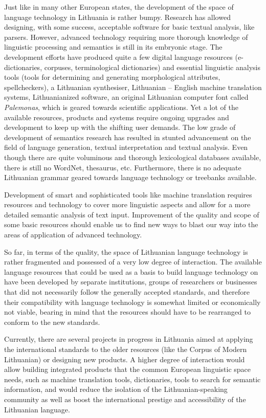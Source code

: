\begin{multicols}{2}
Just like in many other European states, the development of the space of language technology in Lithuania is rather bumpy. Research has allowed designing, with some success, acceptable software for basic textual analysis, like parsers. However, advanced technology requiring more thorough knowledge of linguistic processing and semantics is still in its embryonic stage. The development efforts have produced quite a few digital language resources (e-dictionaries, corpuses, terminological dictionaries) and essential linguistic analysis tools (tools for determining and generating morphological attributes, spellcheckers), a Lithuanian synthesiser, Lithuanian – English machine translation systems, Lithuanianized software, an original Lithuanian computer font called \textit{Palemonas}, which is geared towards scientific applications. Yet a lot of the available resources, products and systems require ongoing upgrades and development to keep up with the shifting user demands. The low grade of development of semantics research has resulted in stunted advancement on the field of language generation, textual interpretation and textual analysis. Even though there are quite voluminous and thorough lexicological databases available, there is still no WordNet, thesaurus, etc. Furthermore, there is no adequate Lithuanian grammar geared towards language technology or treebanks available.

Development of smart and sophisticated tools like machine translation requires resources and technology to cover more linguistic aspects and allow for a more detailed semantic analysis of text input. Improvement of the quality and scope of some basic resources should enable us to find new ways to blast our way into the areas of application of advanced technology.

So far, in terms of the quality, the space of Lithuanian language technology is rather fragmented and possessed of a very low degree of interaction. The available language resources that could be used as a basis to build language technology on have been developed by separate institutions, groups of researchers or businesses that did not necessarily follow the generally accepted standards, and therefore their compatibility with language technology is somewhat limited or economically not viable, bearing in mind that the resources should have to be rearranged to conform to the new standards.

Currently, there are several projects in progress in Lithuania aimed at applying the international standards to the older resources (like the Corpus of Modern Lithuanian) or designing new products. A higher degree of interaction would allow building integrated products that the common European linguistic space needs, such as machine translation tools, dictionaries, tools to search for semantic information, and would reduce the isolation of the Lithuanian-speaking community as well as boost the international prestige and accessibility of the Lithuanian language.


\end{multicols}
